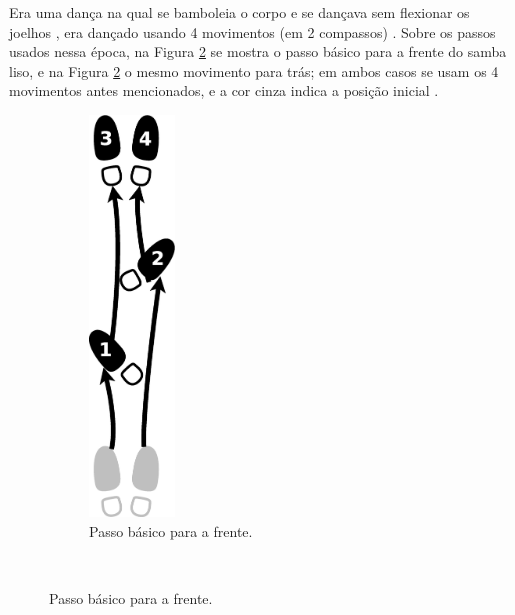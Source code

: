 
Era uma dança na qual se bamboleia o corpo e se dançava sem flexionar os joelhos \cite[pp. 58]{freitas1959danca} \cite[pp. 143]{perna2002samba},
era dançado usando 4 movimentos (em 2 compassos) \cite[pp. 62]{freitas1959danca} \cite[pp. 143]{perna2002samba}.
Sobre os passos usados nessa época, 
na Figura \ref{fig:samba-liso-basico-frente} se mostra o passo básico para a frente do samba liso,
e na  Figura \ref{fig:samba-liso-basico-frente} o mesmo movimento para trás; 
em ambos casos se usam os 4 movimentos antes mencionados, e a cor cinza indica a posição inicial \cite[pp. 63]{freitas1959danca}. 
\begin{figure}[h]
    \centering
    \begin{subfigure}[b]{0.4\textwidth}
        \centering
        \includegraphics[width=0.25\textwidth]{chapters/cap-historia-dancasamba/samba-liso-basico-frente.eps}
        \caption{Passo básico para a frente.}
        \label{fig:samba-liso-basico-frente}
    \end{subfigure}
    ~ %

\end{figure}
